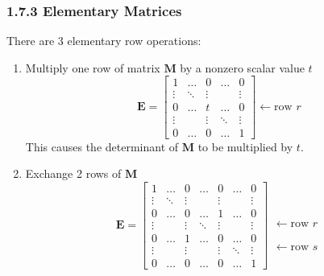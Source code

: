 \documentclass[11pt]{article}
\newcommand{\bm}[1]{\mathbf{#1}}
\begin{document}
\subsubsection*{1.7.3 Elementary Matrices}
There are 3 elementary row operations:
\begin{enumerate}
    \item Multiply one row of matrix $\bm{M}$ by a nonzero scalar value $t$
        \begin{equation}
            \bm{E} = \begin{bmatrix}
                1 & \ldots & 0 & \ldots & 0 \\
                \vdots & \ddots & \vdots & & \vdots \\
                0 & \ldots & t & \ldots & 0 \\
                \vdots & & \vdots & \ddots & \vdots \\
                0 & \ldots & 0 & \ldots & 1
            \end{bmatrix}
            \leftarrow \text{row } r
        \end{equation}
        This causes the determinant of $\bm{M}$ to be multiplied by $t$.
    \item Exchange 2 rows of $\bm{M}$
        \begin{equation}
            \bm{E} = \begin{bmatrix}
                1 & \ldots & 0 & \ldots & 0 & \ldots & 0\\
                \vdots & \ddots & \vdots & & \vdots & & \vdots \\
                0 & \ldots & 0 & \ldots & 1 & \ldots & 0 \\
                \vdots & & \vdots & \ddots & \vdots & & \vdots \\
                0 & \ldots & 1 & \ldots & 0 & \ldots & 0 \\
                \vdots & & \vdots & & \vdots & \ddots & \vdots \\
                0 & \ldots & 0 & \ldots & 0 & \ldots & 1
            \end{bmatrix}
            \begin{matrix}
                \phantom{0}\\
                \phantom{\vdots}\\
                \leftarrow \text{row } r\\
                \phantom{\vdots}\\
                \leftarrow \text{row } s \\

\end{matrix}
\end{equation}
\end{enumerate}
\end{document}
